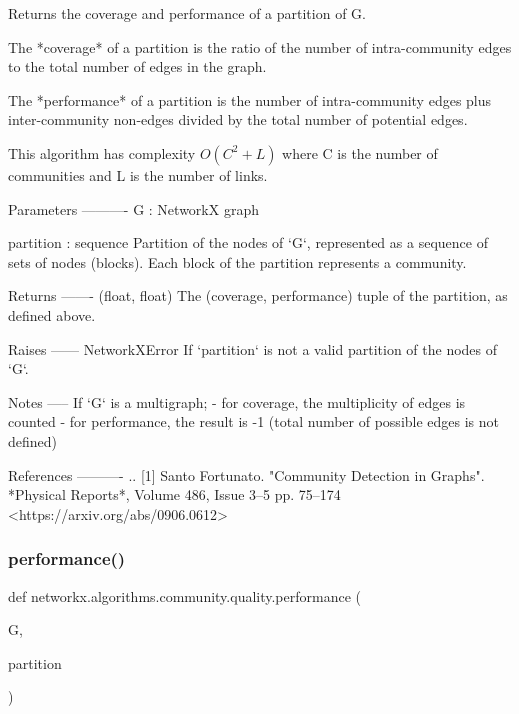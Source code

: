 \begin{DoxyVerb}Returns the coverage and performance of a partition of G.

The *coverage* of a partition is the ratio of the number of
intra-community edges to the total number of edges in the graph.

The *performance* of a partition is the number of
intra-community edges plus inter-community non-edges divided by the total
number of potential edges.

This algorithm has complexity $O(C^2 + L)$ where C is the number of communities and L is the number of links.

Parameters
----------
G : NetworkX graph

partition : sequence
    Partition of the nodes of `G`, represented as a sequence of
    sets of nodes (blocks). Each block of the partition represents a
    community.

Returns
-------
(float, float)
    The (coverage, performance) tuple of the partition, as defined above.

Raises
------
NetworkXError
    If `partition` is not a valid partition of the nodes of `G`.

Notes
-----
If `G` is a multigraph;
    - for coverage, the multiplicity of edges is counted
    - for performance, the result is -1 (total number of possible edges is not defined)

References
----------
.. [1] Santo Fortunato.
       "Community Detection in Graphs".
       *Physical Reports*, Volume 486, Issue 3--5 pp. 75--174
       <https://arxiv.org/abs/0906.0612>
\end{DoxyVerb}
 \mbox{\label{namespacenetworkx_1_1algorithms_1_1community_1_1quality_ad2ebe08be8ae2b1e4c905a9ec4e1ed8f}} 
\subsubsection{\texorpdfstring{performance()}{performance()}}
{\footnotesize\ttfamily def networkx.\+algorithms.\+community.\+quality.\+performance (\begin{DoxyParamCaption}\item[{}]{G,  }\item[{}]{partition }\end{DoxyParamCaption})}


